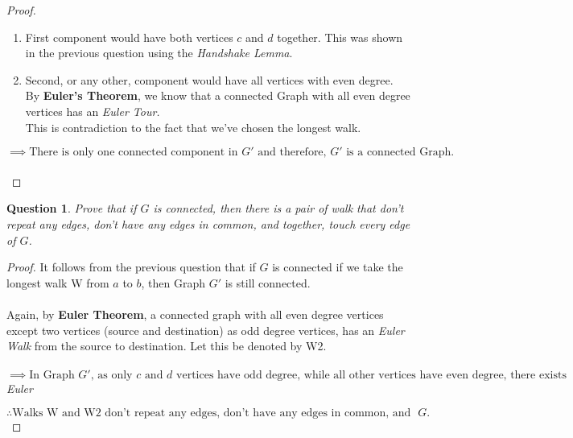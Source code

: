 \documentclass{article}
\newtheorem{question}{Question}
\begin{document}
\begin{proof}
\begin{enumerate}
    \item First component would have both vertices $c$ and $d$ together. This was shown in the previous question using the \textit{Handshake Lemma}.
    \item Second, or any other, component would have all vertices with even degree.\\
    By \textbf{Euler's Theorem}, we know that a connected Graph with all even degree vertices has an \textit{Euler Tour.}\\
    This is contradiction to the fact that we've chosen the longest walk.
    \end{enumerate}
    

    $\implies \text{There is only one connected component in $G'$ and therefore, $G'$ is a connected Graph.}$\\
    \\
\end{proof}

\begin{question}
    Prove that if $G$ is connected, then there is a pair of walk that don’t repeat any edges, don’t have any edges in common, and together, touch every edge of $G$.
\end{question}
\begin{proof}
    It follows from the previous question that if $G$ is connected if we take the longest walk W from $a$ to $b$, then Graph $G'$ is still connected.
    \\ \\
    Again, by \textbf{Euler Theorem}, a connected graph with all even degree vertices except two vertices (source and destination) as odd degree vertices, has an \textit{Euler Walk} from the source to destination. Let this be denoted by W2.
    \\ \\
    $\implies \text{In Graph $G'$, as only $c$ and $d$ vertices have odd degree, while all other vertices have even degree, there exists an}$ \\ \textit{Euler} 
    
    $\therefore \text{Walks W and W2 don't repeat any edges, don't have any edges in common, and together, touch every edge of Graph $G$.}$
\end{proof}
\end{document}

